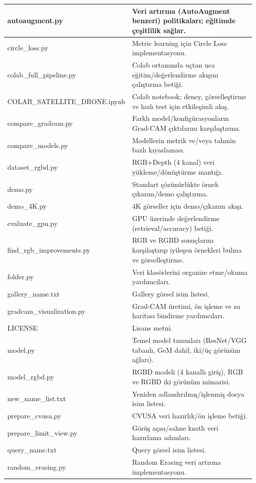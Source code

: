 \documentclass[11pt,a4paper]{article}
\begin{document}
\begin{longtable}{|p{}|p{}|}
autoaugment.py & Veri artırma (AutoAugment benzeri) politikaları; eğitimde çeşitlilik sağlar. \\
\hline
circle_loss.py & Metric learning için Circle Loss implementasyonu. \\
\hline
colab_full_pipeline.py & Colab ortamında uçtan uca eğitim/değerlendirme akışını çalıştırma betiği. \\
\hline
COLAB_SATELLITE_DRONE.ipynb & Colab notebook; deney, görselleştirme ve hızlı test için etkileşimli akış. \\
\hline
compare_gradcam.py & Farklı model/konfigürasyonların Grad-CAM çıktılarını karşılaştırma. \\
\hline
compare_models.py & Modellerin metrik ve/veya tahmin bazlı kıyaslaması. \\
\hline
dataset_rgbd.py & RGB+Depth (4 kanal) veri yükleme/dönüştürme mantığı. \\
\hline
demo.py & Standart çözünürlükte örnek çıkarım/demo çalıştırma. \\
\hline
demo_4K.py & 4K görseller için demo/çıkarım akışı. \\
\hline
evaluate_gpu.py & GPU üzerinde değerlendirme (retrieval/accuracy) betiği. \\
\hline
find_rgb_improvements.py & RGB ve RGBD sonuçlarını karşılaştırıp iyileşen örnekleri bulma ve görselleştirme. \\
\hline
folder.py & Veri klasörlerini organize etme/okuma yardımcıları. \\
\hline
gallery_name.txt & Gallery görsel isim listesi. \\
\hline
gradcam_visualization.py & Grad-CAM üretimi, ön işleme ve ısı haritası bindirme yardımcıları. \\
\hline
LICENSE & Lisans metni. \\
\hline
model.py & Temel model tanımları (ResNet/VGG tabanlı, GeM dahil, iki/üç görünüm ağları). \\
\hline
model_rgbd.py & RGBD modeli (4 kanallı giriş), RGB ve RGBD iki görünüm mimarisi. \\
\hline
new_name_list.txt & Yeniden adlandırılmış/işlenmiş dosya isim listesi. \\
\hline
prepare_cvusa.py & CVUSA veri hazırlık/ön işleme betiği. \\
\hline
prepare_limit_view.py & Görüş açısı/sahne kısıtlı veri hazırlama adımları. \\
\hline
query_name.txt & Query görsel isim listesi. \\
\hline
random_erasing.py & Random Erasing veri artırma implementasyonu. \\

\end{longtable}
\end{document}

